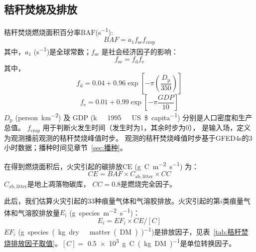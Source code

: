 \subsection{秸秆焚烧及排放}
秸秆焚烧燃烧面积百分率${\mathrm {BAF}}$(\unit{s^{-1}}):
\begin{equation}
  BAF= a_1 f_{\mathrm{se}} f_{\mathrm{crop}}
\end{equation}
其中，$a_1$ (\unit{s^{-1}})是全球常数；$f_{\mathrm{se}}$ 是社会经济因子的影响：
\begin{equation}
  f_{\mathrm{se}} = f_{\mathrm {d}}  f_{\mathrm {e}}
\end{equation}
其中，
\begin{equation}
  f_{\mathrm {d}}  = 0.04 + 0.96\exp\left[-\pi\left(\frac{D_{\mathrm {p}} }{350}\right)\right]
\end{equation}
\begin{equation}
  f_{\mathrm {e}}  = 0.01 + 0.99\exp\left[-\pi\frac{GDP}{10}\right]
\end{equation}
$D_{\mathrm {p}} $ (\unit{person.km^{-2}}) 及 ${\mathrm {GDP}}$ (\unit{k\ 1995\ US\$.capita^{-1}})
分别是人口密度和生产总值。
$f_{\mathrm{crop}}$ 用于判断火发生时间（发生时为1，其余时步为0），
是输入场，定义为观测播前观测的秸秆焚烧峰值时步。
观测的秸秆焚烧峰值时步基于GFED4s的3小时数据；播种时间见章节~\ref{sec:播种}。

在得到燃烧面积后，火灾引起的碳排放${\mathrm {CE}}$ (\unit{g.C.m^{-2}.s^{-1}}) 为：
\begin{equation}
  CE=BAF \times C_{\mathrm{ab,litter}} \times CC
\end{equation}
$C_{\mathrm{ab,litter}}$是地上凋落物碳库， $CC=0.8$是燃烧完全因子。

此后，我们估算火灾引起的33种痕量气体和气溶胶排放。火灾引起的第$i$类痕量气体和气溶胶排放量$E_i$ (\unit{g.species.m^{-2}.s^{-1}})：
\begin{equation}
  E_{i}=EF_{i} \times CE /[{C}]
\end{equation}
$EF_i$ (\unit{g.species.(kg.dry\ matter(DM))^{-1}})是排放因子，见表~\ref{tab:秸秆焚烧排放因子取值}。$[C]=$ \qty{0.5e3}{g.C.(kg.DM)^{-1}}是单位转换因子。


